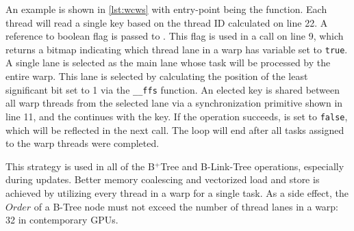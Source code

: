 An example is shown in \cref{lst:wcws} with entry-point being the  function. Each thread will read a single key based on the thread ID calculated on line 22. A reference to  boolean flag is passed to . This flag is used in a  call on line 9, which returns a bitmap indicating which thread lane in a warp has  variable set to \texttt{true}. A single lane is selected as the main lane whose task will be processed by the entire warp. This lane is selected by calculating the position of the least significant bit set to 1 via the \texttt{__ffs} function. An elected key is shared between all warp threads from the selected lane via a synchronization primitive shown in line 11, and the  continues with the key. If the operation succeeds,  is set to \texttt{false}, which will be reflected in the next  call. The loop will end after all tasks assigned to the warp threads were completed.

This strategy is used in all of the B$^+$Tree and B-Link-Tree operations, especially during updates. Better memory coalescing and vectorized load and store is achieved by utilizing every thread in a warp for a single task. As a side effect, the $Order$ of a B-Tree node must not exceed the number of thread lanes in a warp: 32 in contemporary GPUs.